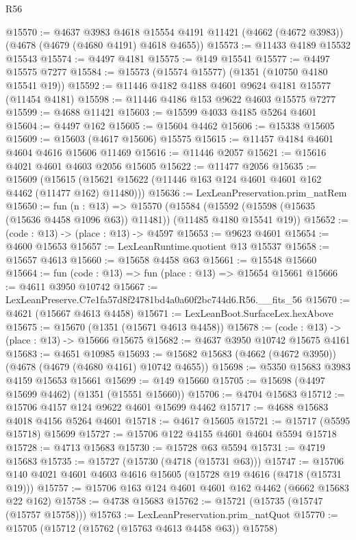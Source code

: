 \begin{lexlean}{R56}
\begin{coremodule}
@15570 := @4637
    @3983
    @4618
    @15554
    @4191
    @11421
    (@4662 (@4672 @3983))
    (@4678 (@4679 (@4680 @4191) @4618 @4655))
@15573 := @11433 @4189 @15532 @15543
@15574 := @4497 @4181
@15575 := @149 @15541
@15577 := @4497 @15575 @7277
@15584 := @15573 (@15574 @15577) (@1351 (@10750 @4180 @15541 @19))
@15592 := @11446 @4182 @4188 @4601 @9624 @4181 @15577 (@11454 @4181)
@15598 := @11446 @4186 @153 @9622 @4603 @15575 @7277
@15599 := @4688 @11421
@15603 := @15599 @4033 @4185 @5264 @4601
@15604 := @4497 @162
@15605 := @15604 @4462
@15606 := @15338 @15605
@15609 := @15603 (@4617 @15606) @15575
@15615 := @11457 @4184 @4601 @4604 @4616 @15606 @11469
@15616 := @11446 @2057
@15621 := @15616 @4021 @4601 @4603 @2056 @15605
@15622 := @11477 @2056
@15635 := @15609
    (@15615 (@15621 @15622 (@11446 @163 @124 @4601 @4601 @162 @4462 (@11477 @162) @11480)))
@15636 := LexLeanPreservation.prim_natRem
@15650 := fun (n : @13) =>
  @15570
    (@15584 (@15592 (@15598 (@15635 (@15636 @4458 @1096 @63)) @11481)) (@11485 @4180 @15541 @19))
@15652 := (code : @13) -> (place : @13) -> @4597
@15653 := @9623 @4601
@15654 := @4600 @15653
@15657 := LexLeanRuntime.quotient @13 @15537
@15658 := @15657 @4613
@15660 := @15658 @4458 @63
@15661 := @15548 @15660
@15664 := fun (code : @13) => fun (place : @13) => @15654 @15661
@15666 := @4611 @3950 @10742
@15667 := LexLeanPreserve.C7e1fa57d8f24781bd4a0a60f2bc744d6.R56.__fits_56
@15670 := @4621 (@15667 @4613 @4458)
@15671 := LexLeanBoot.SurfaceLex.hexAbove
@15675 := @15670 (@1351 (@15671 @4613 @4458))
@15678 := (code : @13) -> (place : @13) -> @15666 @15675
@15682 := @4637 @3950 @10742 @15675 @4161
@15683 := @4651 @10985
@15693 := @15682 @15683 (@4662 (@4672 @3950)) (@4678 (@4679 (@4680 @4161) @10742 @4655))
@15698 := @5350 @15683 @3983 @4159 @15653 @15661
@15699 := @149 @15660
@15705 := @15698 (@4497 @15699 @4462) (@1351 (@15551 @15660))
@15706 := @4704 @15683
@15712 := @15706 @4157 @124 @9622 @4601 @15699 @4462
@15717 := @4688 @15683 @4018 @4156 @5264 @4601
@15718 := @4617 @15605
@15721 := @15717 (@5595 @15718) @15699
@15727 := @15706 @122 @4155 @4601 @4604 @5594 @15718
@15728 := @4713 @15683
@15730 := @15728 @63 @5594
@15731 := @4719 @15683
@15735 := @15727 (@15730 (@4718 (@15731 @63)))
@15747 := @15706 @140 @4021 @4601 @4603 @4616 @15605 (@15728 @19 @4616 (@4718 (@15731 @19)))
@15757 := @15706 @163 @124 @4601 @4601 @162 @4462 (@6662 @15683 @22 @162)
@15758 := @4738 @15683
@15762 := @15721 (@15735 (@15747 (@15757 @15758)))
@15763 := LexLeanPreservation.prim_natQuot
@15770 := @15705 (@15712 (@15762 (@15763 @4613 @4458 @63)) @15758)

\end{coremodule}
\end{lexlean}

